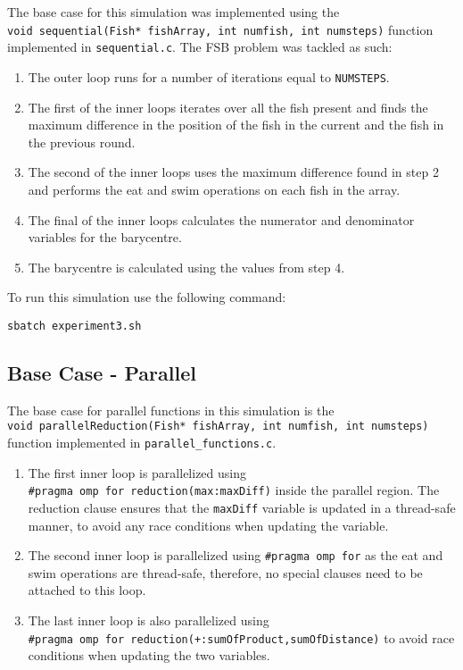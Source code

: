 \documentclass[
]{article}
\begin{document}
The base case for this simulation was implemented using the
\texttt{void\ sequential(Fish*\ fishArray,\ int\ numfish,\ int\ numsteps)}
function implemented in \texttt{sequential.c}. The FSB problem was
tackled as such:

\begin{enumerate}
\def\labelenumi{\arabic{enumi}.}
\item
  The outer loop runs for a number of iterations equal to
  \texttt{NUMSTEPS}.
\item
  The first of the inner loops iterates over all the fish present and
  finds the maximum difference in the position of the fish in the
  current and the fish in the previous round.
\item
  The second of the inner loops uses the maximum difference found in
  step 2 and performs the eat and swim operations on each fish in the
  array.
\item
  The final of the inner loops calculates the numerator and denominator
  variables for the barycentre.
\item
  The barycentre is calculated using the values from step 4.
\end{enumerate}

To run this simulation use the following command:

\begin{verbatim}
sbatch experiment3.sh
\end{verbatim}

\hypertarget{base-case---parallel}{%
\subsection{Base Case - Parallel}\label{base-case---parallel}}

The base case for parallel functions in this simulation is the
\texttt{void\ parallelReduction(Fish*\ fishArray,\ int\ numfish,\ int\ numsteps)}
function implemented in \texttt{parallel\_functions.c}.

\begin{enumerate}
\def\labelenumi{\arabic{enumi}.}
\item
  The first inner loop is parallelized using
  \texttt{\#pragma\ omp\ for\ reduction(max:maxDiff)} inside the
  parallel region. The reduction clause ensures that the
  \texttt{maxDiff} variable is updated in a thread-safe manner, to avoid
  any race conditions when updating the variable.
\item
  The second inner loop is parallelized using
  \texttt{\#pragma\ omp\ for} as the eat and swim operations are
  thread-safe, therefore, no special clauses need to be attached to this
  loop.
\item
  The last inner loop is also parallelized using
  \texttt{\#pragma\ omp\ for\ reduction(+:sumOfProduct,sumOfDistance)}
  to avoid race conditions when updating the two variables.
\end{enumerate}
\end{document}
